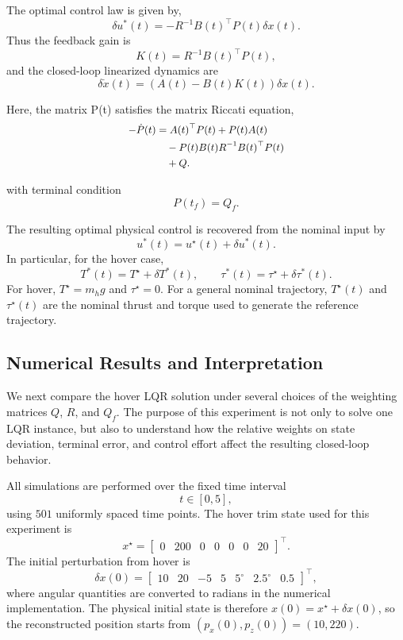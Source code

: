 The optimal control law is given by,
\[
    \delta u^*(t)
    =
    -R^{-1}B(t)^\top P(t)\delta x(t).
\]
Thus the feedback gain is
\[
    K(t)=R^{-1}B(t)^\top P(t),
\]
and the closed-loop linearized dynamics are
\[
    \delta \dot x(t)
    =
    \left(A(t)-B(t)K(t)\right)\delta x(t).
\]

Here, the matrix P(t) satisfies the matrix Riccati equation,
\[
\small
\begin{aligned}
-\dot P(t)
&= A(t)^\top P(t)+P(t)A(t) \\
&\quad -P(t)B(t)R^{-1}B(t)^\top P(t) \\
&\quad + Q .
\end{aligned}
\]

with terminal condition
\[
    P(t_f)=Q_f.
\]

The resulting optimal physical control is recovered from the nominal input by
\[
    u^*(t)
    =
    u^\star(t)+\delta u^*(t).
\]
In particular, for the hover case,
\[
    T^*(t)=T^\star+\delta T^*(t),
    \qquad
    \tau^*(t)=\tau^\star+\delta\tau^*(t).
\]
For hover, \(T^\star=m_hg\) and \(\tau^\star=0\). For a general nominal trajectory, \(T^\star(t)\) and \(\tau^\star(t)\) are the nominal thrust and torque used to generate the reference trajectory.

\subsection{Numerical Results and Interpretation}

We next compare the hover LQR solution under several choices of the weighting matrices \(Q\), \(R\), and \(Q_f\). The purpose of this experiment is not only to solve one LQR instance, but also to understand how the relative weights on state deviation, terminal error, and control effort affect the resulting closed-loop behavior.

All simulations are performed over the fixed time interval
\[
    t\in[0,5],
\]
using \(501\) uniformly spaced time points. The hover trim state used for this experiment is
\[
    x^\star
    =
    \begin{bmatrix}
        0 & 200 & 0 & 0 & 0 & 0 & 20
    \end{bmatrix}^{\top}.
\]
The initial perturbation from hover is
\[
    \delta x(0)
    =
    \begin{bmatrix}
        10 &
        20 &
        -5 &
        5 &
        5^\circ &
        2.5^\circ &
        0.5
    \end{bmatrix}^{\top},
\]
where angular quantities are converted to radians in the numerical implementation. The physical initial state is therefore \(x(0)=x^\star+\delta x(0)\), so the reconstructed position starts from \((p_x(0),p_z(0))=(10,220)\).

